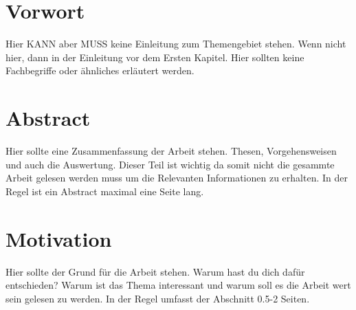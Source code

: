\section*{Vorwort}
Hier KANN aber MUSS keine Einleitung zum Themengebiet stehen. Wenn nicht hier, dann in der Einleitung vor dem Ersten Kapitel. Hier sollten keine Fachbegriffe oder ähnliches erläutert werden.
\vspace{0.5cm}
\section*{Abstract}
Hier sollte eine Zusammenfassung der Arbeit stehen. Thesen, Vorgehensweisen und auch die Auswertung. Dieser Teil ist wichtig da somit nicht die gesammte Arbeit gelesen werden muss um die Relevanten Informationen zu erhalten. In der Regel ist ein Abstract maximal eine Seite lang.
\vspace{0.5cm}
\section*{Motivation}
Hier sollte der Grund für die Arbeit stehen. Warum hast du dich dafür entschieden? Warum ist das Thema interessant und warum soll es die Arbeit wert sein gelesen zu werden. In der Regel umfasst der Abschnitt 0.5-2 Seiten.
